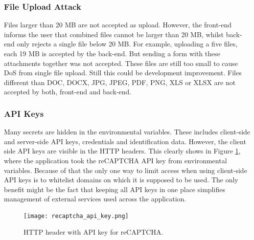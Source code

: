 \documentclass{article} %
\begin{document}
\subsubsection{File Upload Attack}
Files larger than 20 MB are not accepted as upload. However, the front-end informs the user that combined files cannot be larger than 20 MB, whilst back-end only rejects a single file below 20 MB. For example, uploading a five files, each 19 MB is accepted by the back-end. But sending a form with these attachments together was not accepted. These files are still too small to cause DoS from single file upload. Still this could be development improvement. Files different than DOC, DOCX, JPG, JPEG, PDF, PNG, XLS or XLSX are not accepted by both, front-end and back-end.
\subsubsection{API Keys}
Many secrets are hidden in the environmental variables. These includes client-side and server-side API keys, credentials and identification data. However, the client side API keys are visible in the HTTP headers. This clearly shows in Figure \ref{fig:recaptcha_api_key}, where the application took the reCAPTCHA API key from environmental variables. Because of that the only one way to limit access when using client-side API keys is to whitelist domains on which it is supposed to be used. The only benefit might be the fact that keeping all API keys in one place simplifies management of external services used across the application.
\begin{figure}[ht]
  \centering
      \texttt{[image: recaptcha\_api\_key.png]}
  \caption{HTTP header with API key for reCAPTCHA.}
  \label{fig:recaptcha_api_key}
\end{figure}
\newpage
\end{document}
